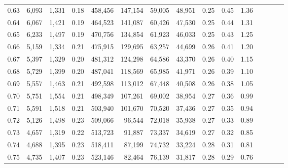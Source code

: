 \begin{tabular}{rrrcrrrrrrrrrrr}
0.63 &   6,093 &  1,331 &                                       0.18 &  458,456 &  147,154 &   59,005 &   48,951 &  0.25 &  0.45 &                         1.36 \\
0.64 &   6,067 &  1,421 &                                       0.19 &  464,523 &  141,087 &   60,426 &   47,530 &  0.25 &  0.44 &                         1.31 \\
0.65 &   6,233 &  1,497 &                                       0.19 &  470,756 &  134,854 &   61,923 &   46,033 &  0.25 &  0.43 &                         1.25 \\
0.66 &   5,159 &  1,334 &                                       0.21 &  475,915 &  129,695 &   63,257 &   44,699 &  0.26 &  0.41 &                         1.20 \\
0.67 &   5,397 &  1,329 &                                       0.20 &  481,312 &  124,298 &   64,586 &   43,370 &  0.26 &  0.40 &                         1.15 \\
0.68 &   5,729 &  1,399 &                                       0.20 &  487,041 &  118,569 &   65,985 &   41,971 &  0.26 &  0.39 &                         1.10 \\
0.69 &   5,557 &  1,463 &                                       0.21 &  492,598 &  113,012 &   67,448 &   40,508 &  0.26 &  0.38 &                         1.05 \\
0.70 &   5,751 &  1,554 &                                       0.21 &  498,349 &  107,261 &   69,002 &   38,954 &  0.27 &  0.36 &                         0.99 \\
0.71 &   5,591 &  1,518 &                                       0.21 &  503,940 &  101,670 &   70,520 &   37,436 &  0.27 &  0.35 &                         0.94 \\
0.72 &   5,126 &  1,498 &                                       0.23 &  509,066 &   96,544 &   72,018 &   35,938 &  0.27 &  0.33 &                         0.89 \\
0.73 &   4,657 &  1,319 &                                       0.22 &  513,723 &   91,887 &   73,337 &   34,619 &  0.27 &  0.32 &                         0.85 \\
0.74 &   4,688 &  1,395 &                                       0.23 &  518,411 &   87,199 &   74,732 &   33,224 &  0.28 &  0.31 &                         0.81 \\
0.75 &   4,735 &  1,407 &                                       0.23 &  523,146 &   82,464 &   76,139 &   31,817 &  0.28 &  0.29 &                         0.76 \\

\end{tabular}
